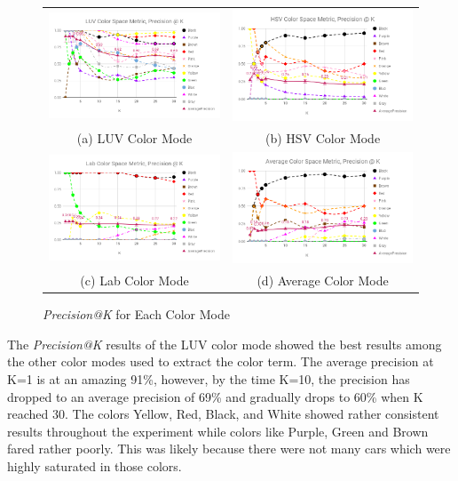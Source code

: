 \begin{figure}[htb!]
  \centering
\begin{tabular}{cc}
 \includegraphics[width=0.5\linewidth]{image/luv@k.png} &
 \includegraphics[width=0.5\linewidth]{image/hsv@k.png}\\
 (a) LUV Color Mode &
 (b) HSV Color Mode \\
 \includegraphics[width=0.5\linewidth]{image/lab@k.png} &
 \includegraphics[width=0.5\linewidth]{image/avg@k.png} \\
 (c) Lab Color Mode&
 (d) Average Color Mode \\
\end{tabular}
\caption{\textit{Precision@K} for Each Color Mode} \label{fig:colorspace_score}
\end{figure}

The \textit{Precision@K} results of the LUV color mode showed the best results among the other color modes used to extract the color term. The average precision at K=1 is at an amazing 91\%, however, by the time K=10, the precision has dropped to an average precision of 69\% and gradually drops to 60\% when K reached 30. The colors Yellow, Red, Black, and White showed rather consistent results throughout the experiment while colors like Purple, Green and Brown fared rather poorly. This was likely because there were not many cars which were highly saturated in those colors. 

